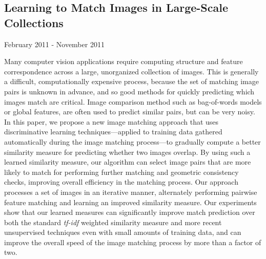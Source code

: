 \documentclass[10pt,letterpaper]{article}
\renewenvironment{itemize}{
  \begin{list}{}{
    \setlength{\leftmargin}{1.5em}
    \setlength{\itemsep}{0.25em}
    \setlength{\parskip}{0pt}
    \setlength{\parsep}{0.25em}
  }
}{
  \end{list}
}
\begin{document}
\subsection*{Learning to Match Images in Large-Scale Collections}
\begin{itemize}
\item February 2011 - November 2011
\item Many computer vision applications require computing structure and feature correspondence across a large, unorganized collection of images.  This is generally a difficult, computationally expensive process, because the set of matching image pairs is unknown in advance, and so good methods for quickly predicting which images match are critical. Image comparison method such as bag-of-words models or global features, are often used to predict similar pairs, but can be very noisy.  In this paper, we propose a new image matching approach that uses discriminative learning techniques---applied to training data gathered automatically during the image matching process---to gradually compute a better similarity measure for predicting whether two images overlap.  By using such a learned similarity measure, our algorithm can select image pairs that are more likely to match for performing further matching and geometric consistency checks, improving overall efficiency in the matching process.  Our approach processes a set of images in an iterative manner, alternately performing pairwise feature matching and learning an improved similarity measure. Our experiments show that our learned measures can significantly improve match prediction over both the standard {\em tf-idf} weighted similarity measure and more recent unsupervised techniques even with small amounts of training data, and can improve the overall speed of the image matching process by more than a factor of two.
\end{itemize}
\end{document}
